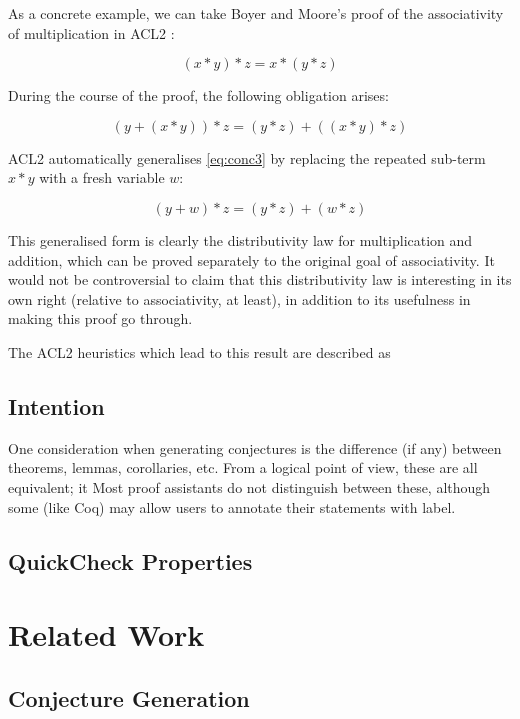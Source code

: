 \documentclass[]{article}
\begin{document}
As a concrete example, we can take Boyer and Moore's proof of the associativity of multiplication in ACL2 \cite{boyer1983proof}:

$$(x * y) * z = x * (y * z)$$

During the course of the proof, the following obligation arises:

\begin{equation}
  \tag{conc3}
  (y + (x * y)) * z = (y * z) + ((x * y) * z)
  \label{eq:conc3}
\end{equation}

ACL2 automatically generalises \eqref{eq:conc3} by replacing the repeated sub-term $x * y$ with a fresh variable $w$:

\begin{equation}
  \tag{conc4}
  (y + w) * z = (y * z) + (w * z)
  \label{eq:conc4}
\end{equation}

This generalised form is clearly the distributivity law for multiplication and addition, which can be proved separately to the original goal of associativity. It would not be controversial to claim that this distributivity law is interesting in its own right (relative to associativity, at least), in addition to its usefulness in making this proof go through.

The ACL2 heuristics which lead to this result are described as

\subsection{Intention}

One consideration when generating conjectures is the difference (if any) between theorems, lemmas, corollaries, etc. From a logical point of view, these are all equivalent; it Most proof assistants do not distinguish between these, although some (like Coq) may allow users to annotate their statements with label.

\subsection{QuickCheck Properties}



\section{Related Work}
\label{related}

\subsection{Conjecture Generation}
\end{document}
